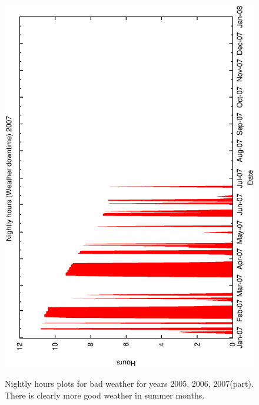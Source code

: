 {{\begin{figure}[htbp]
\begin{center}
{     \includegraphics[scale=0.3, angle=-90]{figures/ecs/met_nightly_stats_weather2007.eps}
     \label{fig:nightly_weather2007}
  }
\end{center}
\caption[Nightly hours plots for bad weather for years 2005, 2006, 2007(part).]
{Nightly hours plots for bad weather for years 2005, 2006, 2007(part). There is clearly more good weather in summer months.}  
\label{fig:met_nightly_weather}
\end{figure}





}}
